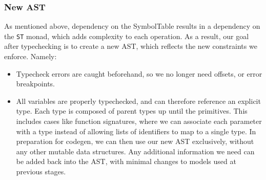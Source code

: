 \documentclass[11pt]{article}
\begin{document}
\subsubsection{New AST}
As mentioned above, dependency on the SymbolTable results in a
dependency on the \texttt{ST} monad, which adds complexity to each
operation.  As a result, our goal after typechecking is to create a
new AST, which reflects the new constraints we enforce.  Namely:
\begin{itemize}
\item Typecheck errors are caught beforehand, so we no longer need
  offsets, or error breakpoints.
\item All variables are properly typechecked, and can therefore
  reference an explicit type. Each type is composed of parent types up
  until the primitives.  This includes cases like function signatures,
  where we can associate each parameter with a type instead of
  allowing lists of identifiers to map to a single type.  In
  preparation for codegen, we can then use our new AST exclusively,
  without any other mutable data structures. Any additional
  information we need can be added back into the AST, with minimal
  changes to models used at previous stages.
\end{itemize}
\end{document}
